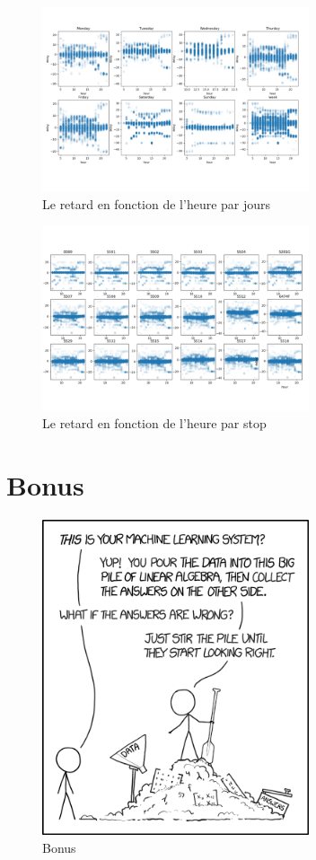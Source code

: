 \begin{appendices}
    \begin{figure}[ht]
        \centering
        \includegraphics[width=0.7\textwidth]{images/delay_day.png}
        \caption{Le retard en fonction de l'heure par jours}
        \label{appendix:delay_day}
    \end{figure}

    \begin{figure}[ht]
        \centering
        \includegraphics[width=0.7\textwidth]{images/delay_stop.png}
        \caption{Le retard en fonction de l'heure par stop}
        \label{appendix:delay_stop}
    \end{figure}

    \chapter{Bonus}
    \begin{figure}[ht]
        \centering
        \includegraphics[width=0.7\textwidth]{images/bonus.png}
        \caption{Bonus}
        \label{appendix:bonus}
    \end{figure}

\end{appendices}